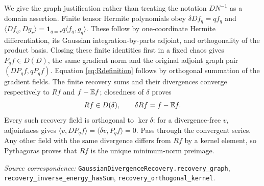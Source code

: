 \documentclass[11pt]{article}
\newcommand{\code}[1]{{\small\nolinkurl{#1}}}
\begin{document}
We give the graph justification rather than treating the notation
$DN^{-1}$ as a domain assertion. Finite tensor Hermite polynomials
obey $\delta Df_q=qf_q$ and
$\langle Df_q,Dg_r\rangle=\mathbf1_{q=r}q\langle f_q,g_q\rangle$.
These follow by one-coordinate Hermite differentiation, its Gaussian
integration-by-parts adjoint, and orthogonality of the product basis.
Closing these finite identities first in a fixed chaos gives
$P_qf\in D(D)$, the same gradient norm and the original adjoint
graph pair $(DP_qf,qP_qf)$. Equation \eqref{eq:Rdefinition} follows by
orthogonal summation of the gradient fields. The finite recovery sums
and their divergences converge respectively to $Rf$ and $f-\mathbb E f$;
closedness of $\delta$ proves
\begin{equation}\label{eq:Rgraph}
 Rf\in D(\delta),\qquad \delta Rf=f-\mathbb E f.
\end{equation}
Every such recovery field is orthogonal to $\ker\delta$: for a
divergence-free $v$, adjointness gives
$\langle v,DP_qf\rangle=\langle\delta v,P_qf\rangle=0$.
Pass through the convergent series. Any other field with the same
divergence differs from $Rf$ by a kernel element, so Pythagoras proves
that $Rf$ is the unique minimum-norm preimage.
\par\smallskip\begingroup\small\raggedright
\textit{Source correspondence:} \code{GaussianDivergenceRecovery.recovery_graph},
\code{recovery_inverse_energy_hasSum}, \code{recovery_orthogonal_kernel}.
\par\endgroup
\end{document}
